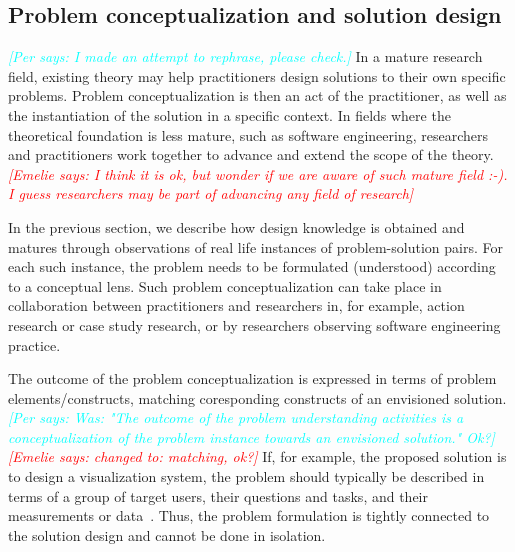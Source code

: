 \documentclass[graybox]{svmult}
\newcommand{\emelie}[1]{\textcolor{red}{{\it [Emelie says: #1]}}}
\newcommand{\peggy}[1]{\textcolor{blue}{{\it [Peggy says: #1]}}}
\newcommand{\per}[1]{\textcolor{cyan}{{\it [Per says: #1]}}}
\newcommand{\emelie}[1]{}
\newcommand{\peggy}[1]{}
\newcommand{\per}[1]{}
\begin{document}
\subsection{Problem conceptualization and solution design}


\per{I made an attempt to rephrase, please check.}
In a mature research field, existing theory may help practitioners design solutions to their own specific problems. Problem conceptualization is then an act of the practitioner, as well as the instantiation of the solution in a specific context. In fields where the theoretical foundation is less mature, such as software engineering, researchers and practitioners work together to advance and extend the scope of the theory. \emelie{I think it is ok, but wonder if we are aware of such mature field :-). I guess researchers may be part of advancing any field of research}

 In the previous section, we describe how design knowledge is obtained and matures through observations of real life instances of problem-solution pairs. For each such instance, the problem needs to be formulated (understood) according to a conceptual lens. Such problem conceptualization can take place in collaboration between practitioners and researchers in, for example, action research or case study research, or by researchers observing software engineering practice.


The outcome of the problem conceptualization is expressed in terms of problem elements/constructs, matching coresponding constructs of an envisioned solution. \per{Was: "The outcome of the problem understanding activities is a conceptualization of the problem instance towards an envisioned solution." Ok?}\emelie{changed to: matching, ok?} If, for example, the proposed solution is to design a visualization system, the problem should typically be described in terms of a group of target users, their questions and tasks, and their measurements or data~\cite{meyer_nested_2015}. Thus, the problem formulation is tightly connected to the solution design and cannot be done in isolation. 
\end{document}
